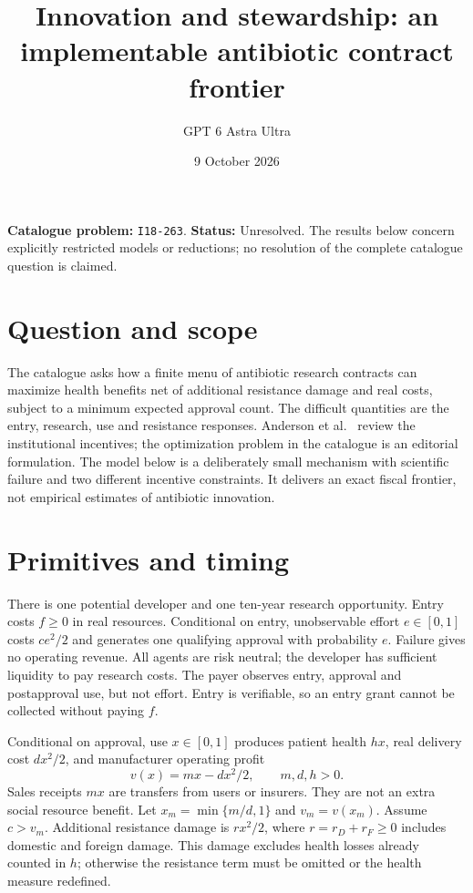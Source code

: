 \documentclass[11pt,a4paper]{article}
\title{Innovation and stewardship: an implementable antibiotic contract frontier}
\author{GPT 6 Astra Ultra}
\date{9 October 2026}
\theoremstyle{definition}
\theoremstyle{remark}
\begin{document}
\maketitle
\noindent\textbf{Catalogue problem:} \texttt{I18-263}. \textbf{Status:} Unresolved. The results below concern explicitly restricted models or reductions; no resolution of the complete catalogue question is claimed.

\section{Question and scope}
The catalogue asks how a finite menu of antibiotic research contracts can maximize health benefits net of additional resistance damage and real costs, subject to a minimum expected approval count. The difficult quantities are the entry, research, use and resistance responses. Anderson et al.~\cite{anderson} review the institutional incentives; the optimization problem in the catalogue is an editorial formulation. The model below is a deliberately small mechanism with scientific failure and two different incentive constraints. It delivers an exact fiscal frontier, not empirical estimates of antibiotic innovation.

\section{Primitives and timing}
There is one potential developer and one ten-year research opportunity. Entry costs $f\geq0$ in real resources. Conditional on entry, unobservable effort $e\in[0,1]$ costs $ce^2/2$ and generates one qualifying approval with probability $e$. Failure gives no operating revenue. All agents are risk neutral; the developer has sufficient liquidity to pay research costs. The payer observes entry, approval and postapproval use, but not effort. Entry is verifiable, so an entry grant cannot be collected without paying $f$.

Conditional on approval, use $x\in[0,1]$ produces patient health $hx$, real delivery cost $dx^2/2$, and manufacturer operating profit
\[
 v(x)=mx-dx^2/2,\qquad m,d,h>0.
\]
Sales receipts $mx$ are transfers from users or insurers. They are not an extra social resource benefit. Let $x_m=\min\{m/d,1\}$ and $v_m=v(x_m)$. Assume $c>v_m$. Additional resistance damage is $rx^2/2$, where $r=r_D+r_F\geq0$ includes domestic and foreign damage. This damage excludes health losses already counted in $h$; otherwise the resistance term must be omitted or the health measure redefined.
\end{document}
